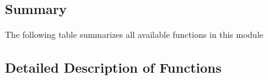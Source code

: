 \documentclass[letterpaper,10pt,english]{sphinxmanual}
\begin{document}
\subsection{Summary}
\label{\detokenize{dnpFit:summary}}
The following table summarizes all available functions in this module


\subsection{Detailed Description of Functions}
\label{\detokenize{dnpFit:module-dnpLab.dnpFit}}\label{\detokenize{dnpFit:detailed-description-of-functions}}
\end{document}
